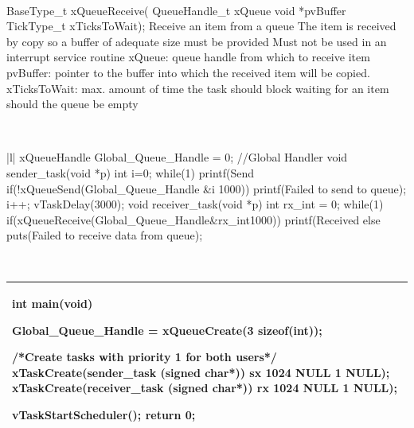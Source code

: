 \begin{description}
\os{\newpage}



\item[{\rot\bf Receive Data through Queues}]~\\[-3ex]
\bi
\ite BaseType_t xQueueReceive(
\ite     QueueHandle_t xQueue void *pvBuffer
\ite     TickType_t xTicksToWait);
\ite Receive an item from a queue
\bi
\ite The item is received by copy so a buffer of adequate size must be provided
\ite Must not be used in an interrupt service routine
\ite xQueue: queue handle from which to receive item
\ite pvBuffer: pointer to the buffer into which the received item will be copied.
\ite xTicksToWait: max. amount of time the task should block waiting for an item should the queue be empty
\ei
\ei

\os{\newpage}



\item[{\rot\bf Example of Queues (1/2)}]~\\[-3ex]
\begin{tabular}{|l|} \hline
xQueueHandle Global_Queue_Handle = 0; //Global Handler
void sender_task(void *p){  int i=0;
  while(1){
    printf(Send %
    if(!xQueueSend(Global_Queue_Handle &i 1000))
      printf(Failed to send to queue);		
    i++;        vTaskDelay(3000);   }
}
void receiver_task(void *p){
  int rx_int = 0;
  while(1){
    if(xQueueReceive(Global_Queue_Handle&rx_int1000))
	   printf(Received %
    else puts(Failed to receive data from queue);  }
}  \\ \hline
\end{tabular}


\os{\newpage}



\item[{\rot\bf Example of Queues (2/2)}]~\\[-3ex]
\begin{tabular}{|l|} \hline
int main(void){

  Global_Queue_Handle = xQueueCreate(3 sizeof(int));

  /*Create tasks with priority 1 for both users*/
   xTaskCreate(sender_task (signed char*)) sx
      1024 NULL 1 NULL);
   xTaskCreate(receiver_task (signed char*)) rx
       1024 NULL 1 NULL);
	
   vTaskStartScheduler();
   return 0;
}  \\ \hline
\end{tabular}


\os{\newpage}



\end{description}


